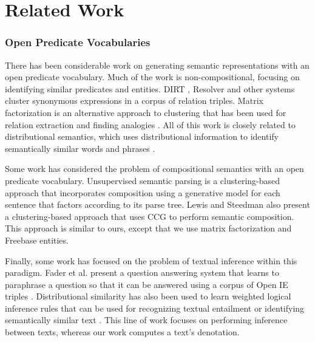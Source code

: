 \documentclass[11pt]{article}
\begin{document}

\section{Related Work}
\label{sec:priorwork}

\subsubsection*{Open Predicate Vocabularies}

There has been considerable work on generating semantic
representations with an open predicate vocabulary. Much of the work is
non-compositional, focusing on identifying similar predicates and
entities. DIRT \cite{lin2001}, Resolver \cite{yates07resolver} and
other systems \cite{yao2012} cluster synonymous expressions in a
corpus of relation triples. Matrix factorization is an alternative
approach to clustering that has been used for relation extraction
\cite{riedel2013,yao2013} and finding analogies
\cite{turney2008,speer2008}. All of this work is closely related to
distributional semantics, which uses distributional information to
identify semantically similar words and phrases
\cite{turney2010,griffiths2007}.

Some work has considered the problem of compositional semantics with
an open predicate vocabulary. Unsupervised semantic parsing
\cite{poon2009unsupervised,titov2011} is a clustering-based approach
that incorporates composition using a generative model for each
sentence that factors according to its parse tree. Lewis and Steedman
 also present a clustering-based approach that
uses CCG to perform semantic composition. This approach is similar to
ours, except that we use matrix factorization and Freebase entities.

Finally, some work has focused on the problem of textual inference
within this paradigm. Fader et al.  present a
question answering system that learns to paraphrase a question so that
it can be answered using a corpus of Open IE triples \cite{fader2011}.
Distributional similarity has also been used to learn weighted logical
inference rules that can be used for recognizing textual entailment or
identifying semantically similar text
\cite{garrette2011,garrette2013,beltagy2013}. This line of work
focuses on performing inference between texts, whereas our work
computes a text's denotation.
\end{document}
